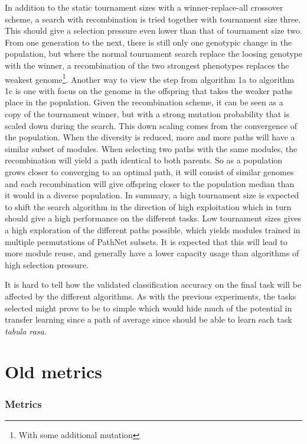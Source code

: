In addition to the static tournament sizes with a winner-replace-all crossover scheme, a search with recombination is tried together with tournament size three.  This should give a selection pressure even lower than that of tournament size two. From one generation to the next, there is still only one genotypic change in the population, but where the normal tournament search replace the loosing genotype with the winner, a recombination of the two strongest phenotypes replaces the weakest genome\footnote{With some additional mutation}.  Another way to view the step from algorithm 1a to algorithm 1c is one with focus on the genome in the offspring that takes the weaker paths place in the population. Given the recombination scheme, it can be seen as a copy of the tournament winner, but with a strong mutation probability that is scaled down during the search. This down scaling comes from the convergence of the population. When the diversity is reduced, more and more paths will have a similar subset of modules. When selecting two paths with the same modules, the recombination will yield a path identical to both parents. So as a population grows closer to converging to an optimal path, it will consist of similar genomes and each recombination will give offspring closer to the population median than it would in a diverse population. 
In summary, a high tournament size is expected to shift the search algorithm in the direction of high exploitation which in turn should give a high performance on the different tasks. Low tournament sizes gives a high exploration of the different paths possible, which yields modules trained in multiple permutations of PathNet subsets. It is expected that this will lead to more module reuse, and generally have a lower capacity usage than algorithms of high selection pressure. 

It is hard to tell how the validated classification accuracy on the final task will be affected by the different algorithms. As with the previous experiments, the tasks selected might prove to be to simple which would hide much of the potential in transfer learning since a path of average since should be able to learn each task \textit{tabula rasa}.
\chapter{Old metrics}
\subsection{Metrics}
\label{exp2:metrics}

